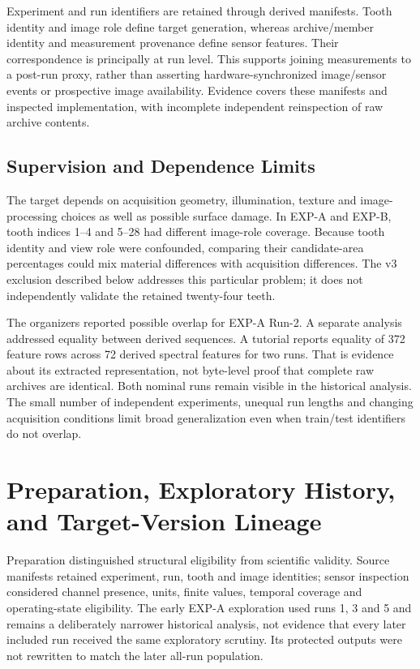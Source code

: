 Experiment and run identifiers are retained through derived manifests. Tooth identity
and image role define target generation, whereas archive/member identity and measurement
provenance define sensor features. Their correspondence is principally at run level.
This supports joining measurements to a post-run proxy, rather than asserting
hardware-synchronized image/sensor events or prospective image availability. Evidence
covers these manifests and inspected implementation, with incomplete independent
reinspection of raw archive contents.

\subsection{Supervision and Dependence Limits}
The target depends on acquisition geometry, illumination, texture and image-processing
choices as well as possible surface damage. In EXP-A and EXP-B, tooth indices 1--4 and
5--28 had different image-role coverage. Because tooth identity and view role were
confounded, comparing their candidate-area percentages could mix material differences
with acquisition differences. The v3 exclusion described below addresses this particular
problem; it does not independently validate the retained twenty-four teeth.

The organizers reported possible overlap for EXP-A Run-2. A separate analysis addressed
equality between derived sequences. A tutorial reports equality of 372 feature rows
across 72 derived spectral features for two runs. That is evidence about its extracted
representation, not byte-level proof that complete raw archives are identical. Both
nominal runs remain visible in the historical analysis. The small number of independent
experiments, unequal run lengths and changing acquisition conditions limit broad
generalization even when train/test identifiers do not overlap.

\section{Preparation, Exploratory History, and Target-Version Lineage}
Preparation distinguished structural eligibility from scientific validity. Source
manifests retained experiment, run, tooth and image identities; sensor inspection
considered channel presence, units, finite values, temporal coverage and operating-state
eligibility. The early EXP-A exploration used runs 1, 3 and 5 and remains a deliberately
narrower historical analysis, not evidence that every later included run received the
same exploratory scrutiny. Its protected outputs were not rewritten to match the later
all-run population.

